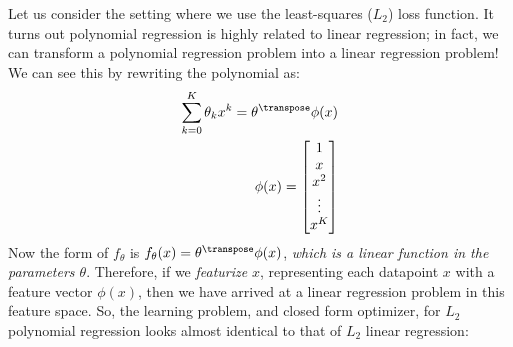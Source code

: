 Let us consider the setting where we use the least-squares ($L_2$) loss function. It turns out polynomial regression is highly related to linear regression; in fact, we can transform a polynomial regression problem into a linear regression problem! We can see this by rewriting the polynomial as:
\begin{align}
    \sum_{k=0}^K \theta_k x^k = \theta^\transpose\phi(x)\\
    \quad\quad\quad\quad \phi(x) = \begin{bmatrix}
                            1 \\ x \\ x^2 \\ \vdots \\ x^K
                        \end{bmatrix}
\end{align}
Now the form of $f_{\theta}$ is $f_{\theta}(x) = \theta^\transpose\phi(x)$, \textit{which is a linear function in the parameters $\theta$}. Therefore, if we \textit{featurize} $x$, representing each datapoint $x$ with a feature vector $\phi(x)$, then we have arrived at a linear regression problem in this feature space. So, the learning problem, and closed form optimizer, for $L_2$ polynomial regression looks almost identical to that of $L_2$ linear regression:

\begin{center}
\end{center}


